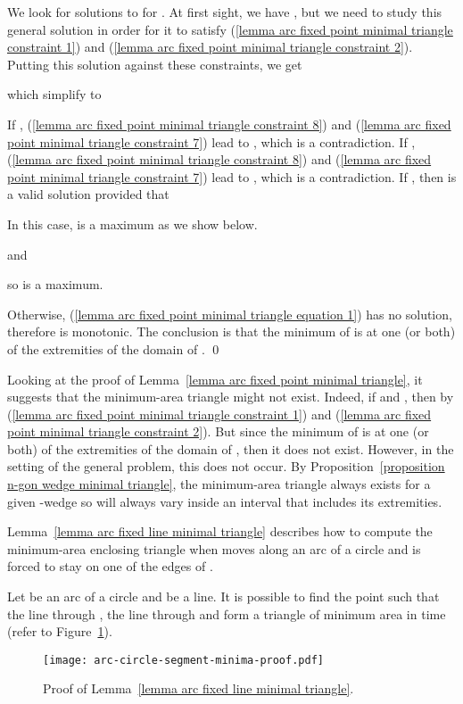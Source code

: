 \documentclass[11pt, oneside]{article}
\begin{document}
We look for solutions to 
for .
At first sight,
we have ,
but we need to study this general solution
in order for it to satisfy (\ref{lemma arc fixed point minimal triangle constraint 1})
and (\ref{lemma arc fixed point minimal triangle constraint 2}).
Putting this solution against these constraints,
we get

which simplify to

If ,
(\ref{lemma arc fixed point minimal triangle constraint 8}) and (\ref{lemma arc fixed point minimal triangle constraint 7})
lead to ,
which is a contradiction.
If ,
(\ref{lemma arc fixed point minimal triangle constraint 8}) and (\ref{lemma arc fixed point minimal triangle constraint 7})
lead to ,
which is a contradiction.
If ,
then 
is a valid solution provided that


In this case,
 is a maximum as we show below.

and

so  is a maximum.

Otherwise,
(\ref{lemma arc fixed point minimal triangle equation 1}) has no solution,
therefore  is monotonic.
The conclusion is that
the minimum of 
is at one (or both) of the extremities
of the domain of .
\qed

Looking at the proof of Lemma~\ref{lemma arc fixed point minimal triangle},
it suggests that the minimum-area triangle might not exist.
Indeed,
if 
and ,
then 
by (\ref{lemma arc fixed point minimal triangle constraint 1})
and (\ref{lemma arc fixed point minimal triangle constraint 2}).
But since the minimum of 
is at one (or both) of the extremities
of the domain of ,
then it does not exist.
However,
in the setting of the general problem,
this does not occur.
By Proposition~\ref{proposition n-gon wedge minimal triangle},
the minimum-area triangle always exists
for a given -wedge
so  will always vary inside an interval
that includes its extremities.

Lemma~\ref{lemma arc fixed line minimal triangle}
describes how to compute the minimum-area enclosing triangle
when  moves along an arc of a circle
and  is forced to stay on one of the edges of .
\begin{lemma}
\label{lemma arc fixed line minimal triangle}
Let  be an arc of a circle
and  be a line.
It is possible to find the point 
such that the line through ,
the line through 
and 
form a triangle of minimum area
in  time
(refer to Figure~\ref{arc-circle-segment-minima-proof}).
\begin{figure}
\centering
\texttt{[image: arc-circle-segment-minima-proof.pdf]}
\caption{Proof of Lemma~\ref{lemma arc fixed line minimal triangle}.\label{arc-circle-segment-minima-proof}}
\end{figure}
\end{lemma}
\end{document}

